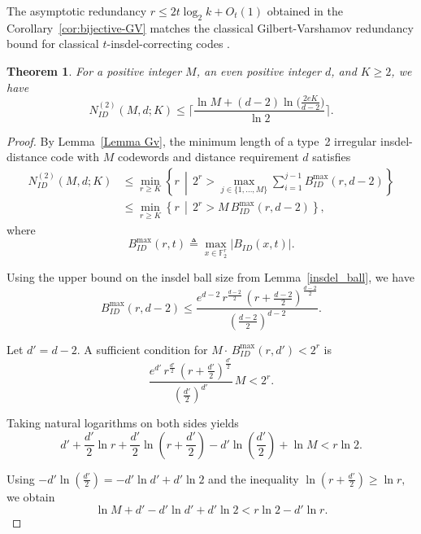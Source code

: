 \documentclass[11 pt]{article}
\numberwithin{equation}{section}
\newtheorem{theorem}{Theorem}[section]
\begin{document}
    The asymptotic redundancy $r\le 2t\log_2 k + O_t(1)$ obtained in the Corollary~\ref{cor:bijective-GV} matches the classical Gilbert-Varshamov redundancy bound for classical $t$-insdel-correcting codes \cite{levenshtein1965двоичные}.
    \begin{theorem}\label{N_M_d_bound}
        For a positive integer $M$, an even positive integer $d$, and $K \geq 2$, we have
        \[
            N_{ID}^{(2)}(M,d;K) \le \Bigg\lceil \frac{\ln M + (d-2)\ln\!\Big(\frac{2eK}{d-2}\Big)}{\ln 2}\Bigg\rceil.
        \]
    \end{theorem}

    \begin{proof}
        By Lemma~\ref{Lemma Gv}, the minimum length of a type~2 irregular insdel-distance code with $M$ codewords and distance requirement $d$ satisfies
        \begin{align*}
            N^{(2)}_{ID}(M,d;K) &\le \min_{r \ge K} \left\{r \,\middle|\, 2^r > \max_{j \in \{1,\ldots,M\}} \sum_{i=1}^{j-1} B^{\max}_{ID}(r,d-2)\right\} \\
            &\le \min_{r \ge K}\left\{r \,\middle|\, 2^r > M \, B^{\max}_{ID}(r,d-2)\right\},
        \end{align*}
        where
        \[
            B^{\max}_{ID}(r,t)
            \triangleq
            \max_{x \in \mathbb{F}_2^r}
            \left| B_{ID}(x,t) \right|.
        \]

        Using the upper bound on the insdel ball size from Lemma~\ref{insdel_ball}, we have
        \[
        B^{\max}_{ID}(r,d-2)
        \le
        \frac{
        e^{d-2}\,r^{\frac{d-2}{2}}\,
        \left(r+\frac{d-2}{2}\right)^{\frac{d-2}{2}}}{\left(\frac{d-2}{2}\right)^{d-2}}.
        \]

        Let $d' = d-2$. A sufficient condition for
        \(M  \cdot\, B^{\max}_{ID}(r,d') < 2^r\)
        is
        \[
            \frac{
            e^{d'}\,r^{\frac{d'}{2}}\,
            \left(r+\frac{d'}{2}\right)^{\frac{d'}{2}}}{\left(\frac{d'}{2}\right)^{d'}}\, M < 2^r.
        \]

        Taking natural logarithms on both sides yields
        \[
            d' + \frac{d'}{2}\ln r
            + \frac{d'}{2}\ln\!\left(r+\frac{d'}{2}\right)
            - d'\ln\!\left(\frac{d'}{2}\right)
            + \ln M
            < r \ln 2.
        \]

        Using
        \(
            -d'\ln\!\left(\frac{d'}{2}\right)
            = -d'\ln d' + d'\ln 2
        \)
        and the inequality
        \(
        \ln\!\left(r+\frac{d'}{2}\right) \ge \ln r,
        \)
        we obtain
        \[
            \ln M + d' - d'\ln d' + d'\ln 2 < r\ln 2 - d'\ln r.
        \]


\end{proof}
\end{document}

